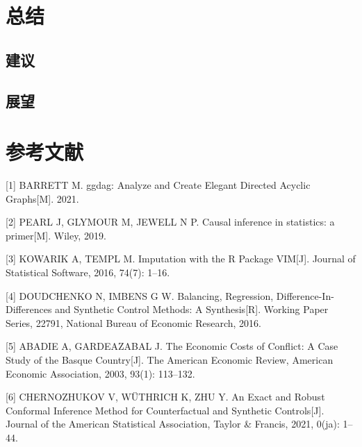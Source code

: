 \documentclass[]{ctexart}
\begin{document}
\hypertarget{ux603bux7ed3}{%
\section{总结}\label{ux603bux7ed3}}

\hypertarget{ux5efaux8bae}{%
\subsection{建议}\label{ux5efaux8bae}}

\hypertarget{ux5c55ux671b}{%
\subsection{展望}\label{ux5c55ux671b}}

\hypertarget{ux53c2ux8003ux6587ux732e}{%
\section*{参考文献}\label{ux53c2ux8003ux6587ux732e}}

\hypertarget{refs}{}
\leavevmode\hypertarget{ref-citation_ggdag}{}%
{[}1{]} BARRETT M. ggdag: Analyze and Create Elegant Directed Acyclic
Graphs{[}M{]}. 2021.

\leavevmode\hypertarget{ref-pearl}{}%
{[}2{]} PEARL J, GLYMOUR M, JEWELL N P. Causal inference in statistics:
a primer{[}M{]}. Wiley, 2019.

\leavevmode\hypertarget{ref-citation_VIM}{}%
{[}3{]} KOWARIK A, TEMPL M. Imputation with the R Package VIM{[}J{]}.
Journal of Statistical Software, 2016, 74(7): 1--16.

\leavevmode\hypertarget{ref-NBERw22791}{}%
{[}4{]} DOUDCHENKO N, IMBENS G W. Balancing, Regression,
Difference-In-Differences and Synthetic Control Methods: A
Synthesis{[}R{]}. Working Paper Series, 22791, National Bureau of
Economic Research, 2016.

\leavevmode\hypertarget{ref-sc_method}{}%
{[}5{]} ABADIE A, GARDEAZABAL J. The Economic Costs of Conflict: A Case
Study of the Basque Country{[}J{]}. The American Economic Review,
American Economic Association, 2003, 93(1): 113--132.

\leavevmode\hypertarget{ref-doi:10.1080ux2f01621459.2021.1920957}{}%
{[}6{]} CHERNOZHUKOV V, WÜTHRICH K, ZHU Y. An Exact and Robust Conformal
Inference Method for Counterfactual and Synthetic Controls{[}J{]}.
Journal of the American Statistical Association, Taylor \& Francis,
2021, 0(ja): 1--44.
\end{document}
